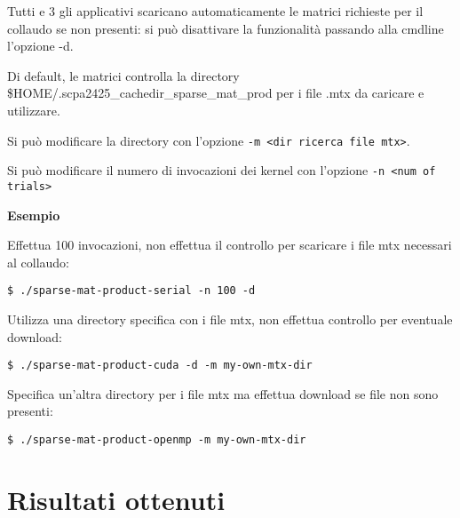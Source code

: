 \documentclass[a4paper,9pt]{extarticle}
\begin{document}
Tutti e 3 gli applicativi scaricano automaticamente le matrici richieste per il 
collaudo se non presenti: si può disattivare la funzionalità passando alla cmdline
l'opzione -d. 

Di default, le matrici controlla la directory 
\$HOME/.scpa2425\_cachedir\_sparse\_mat\_prod per i file .mtx da caricare e utilizzare.

Si può modificare la directory con l'opzione \texttt{-m <dir ricerca file mtx>}.

Si può modificare il numero di invocazioni dei kernel con l'opzione \texttt{-n <num of trials>}

\textbf{Esempio}

Effettua 100 invocazioni, non effettua il controllo per scaricare i file mtx necessari al collaudo:
\begin{lstlisting}
$ ./sparse-mat-product-serial -n 100 -d
\end{lstlisting}

Utilizza una directory specifica con i file mtx, non effettua controllo per eventuale download:
\begin{lstlisting}
$ ./sparse-mat-product-cuda -d -m my-own-mtx-dir
\end{lstlisting}

Specifica un'altra directory per i file mtx ma effettua download se file non sono presenti:
\begin{lstlisting}
$ ./sparse-mat-product-openmp -m my-own-mtx-dir
\end{lstlisting}

\pagebreak
	
\section{Risultati ottenuti}
\end{document}
